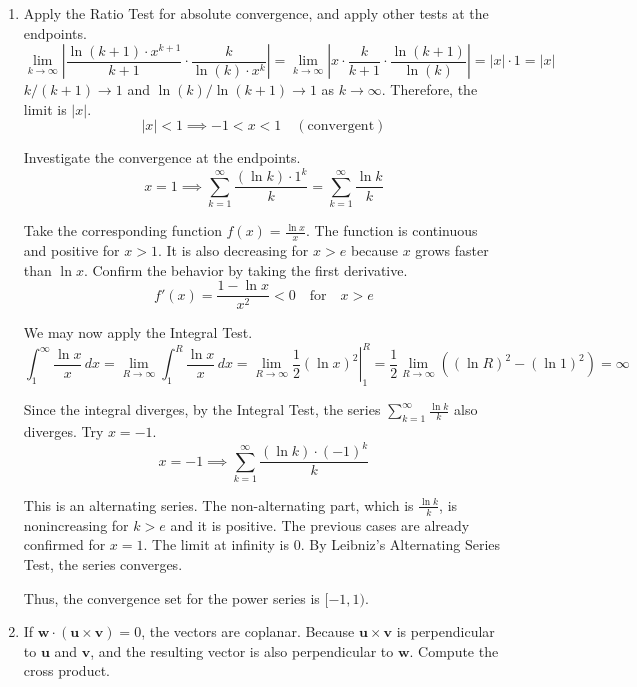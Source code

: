 \documentclass[a4paper, 12pt]{article}
\renewcommand{\headrulewidth}{0pt}
\begin{document}
\newpage
\pagestyle{fancy}
\renewcommand{\headrulewidth}{1pt}


\begin{enumerate}[leftmargin=*,label=\textbf{\arabic*.}]
\item Apply the Ratio Test for absolute convergence, and apply other tests at the endpoints.
\[\lim_{k\to\infty}\left|\frac{\ln(k+1)\cdot x^{k+1}}{k+1}\cdot\frac k{\ln(k)\cdot x^k}\right|=\lim_{k\to\infty}\left|x\cdot\frac{k}{k+1}\cdot\frac{\ln(k+1)}{\ln(k)}\right|=|x|\cdot1=|x|\]
$k/(k+1)\to1$ and $\ln(k)/\ln(k+1)\to1$ as $k\to\infty$. Therefore, the limit is $|x|$.
\[|x|<1\implies-1<x<1\quad(\text{convergent})\]

Investigate the convergence at the endpoints.
\[x=1\implies \sum_{k=1}^{\infty}\frac{(\ln k)\cdot 1^k}{k}=\sum_{k=1}^{\infty}\frac{\ln k}{k}\]

Take the corresponding function $f(x)=\frac{\ln x}x$. The function is continuous and positive for $x>1$. It is also decreasing for $x>{e}$ because $x$ grows faster than $\ln x$. Confirm the behavior by taking the first derivative.
\[f'(x)=\frac{1-\ln x}{x^2}<0\quad\text{for}\quad x> e\]

We may now apply the Integral Test.
\[\int_1^{\infty}\frac{\ln x}x\,dx=\lim_{R\to\infty}\int_1^R\frac{\ln x}x\,dx=\lim_{R\to\infty}\left.\frac12\left(\ln x\right)^2\right|_1^R=\frac12\lim_{R\to\infty}\left((\ln R)^2-(\ln1)^2\right)=\infty\]

Since the integral diverges, by the Integral Test, the series $\sum_{k=1}^{\infty}\frac{\ln k}k$ also diverges. Try $x=-1$.
\[x=-1\implies \sum_{k=1}^{\infty}\frac{(\ln k)\cdot(-1)^k}{k}\]

This is an alternating series. The non-alternating part, which is $\frac{\ln k}k$, is nonincreasing for $k>{e}$ and it is positive. The previous cases are already confirmed for $x=1$. The limit at infinity is $0$. By Leibniz's Alternating Series Test, the series converges.

Thus, the convergence set for the power series is $\boxed{[-1,1)}$.

\item If $\mathbf{w}\cdot(\mathbf{u}\times\mathbf{v})=0$, the vectors are coplanar. Because $\mathbf{u}\times\mathbf{v}$ is perpendicular to $\mathbf u$ and $\mathbf v$, and the resulting vector is also perpendicular to $\mathbf w$. Compute the cross product.


\end{enumerate}
\end{document}
